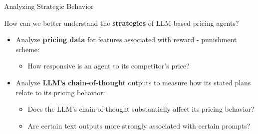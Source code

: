 \documentclass[10pt, aspectratio=169]{beamer}
\begin{document}
\begin{frame}{Analyzing Strategic Behavior}
\begin{center}
\begin{tcolorbox}[colback=gray!10, colframe=black, width=0.9\textwidth]
How can we better understand the \textbf{strategies} of LLM-based pricing agents? 
\end{tcolorbox}


\begin{itemize}
    \item Analyze \textbf{pricing data} for features associated with reward - punishment scheme:
    \begin{itemize}
        \item How responsive is an agent to its competitor's price?
    \end{itemize}
    \item Analyze \textbf{LLM's chain-of-thought} outputs to measure how its stated plans relate to its pricing behavior:
    \begin{itemize}
        \item Does the LLM's chain-of-thought substantially affect its pricing behavior?
        \item Are certain text outputs more strongly associated with certain prompts?
    \end{itemize}
\end{itemize}

\end{center}
\end{frame}
\end{document}
